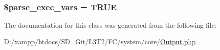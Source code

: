 \subsubsection[{\$parse\+\_\+exec\+\_\+vars}]{\setlength{\rightskip}{0pt plus 5cm}\$parse\+\_\+exec\+\_\+vars = T\+R\+U\+E}\label{class_c_i___output_a254d73d122352494697cdba0c509086d}


The documentation for this class was generated from the following file\+:\begin{DoxyCompactItemize}
\item 
D\+:/xampp/htdocs/\+S\+D\+\_\+\+Git/\+L3\+T2/\+F\+C/system/core/\hyperlink{_output_8php}{Output.\+php}\end{DoxyCompactItemize}
